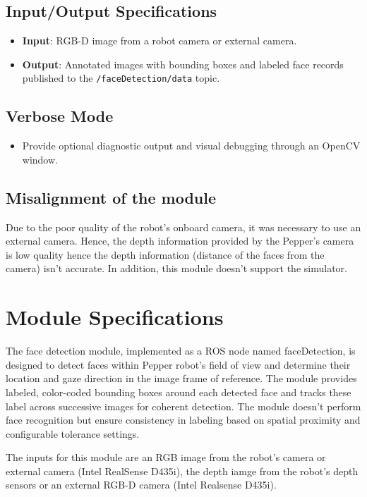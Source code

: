 \documentclass{CSSRforAfrica}
\begin{document}
\subsection*{Input/Output Specifications}
\begin{itemize}
	\item \textbf{Input}: RGB-D image from a robot camera or external camera.
	\item \textbf{Output}: Annotated images with bounding boxes and labeled face records published to the \texttt{/faceDetection/data} topic.
\end{itemize}

\subsection*{Verbose Mode}
\begin{itemize}
	\item Provide optional diagnostic output and visual debugging through an OpenCV window.
\end{itemize}


\subsection*{Misalignment of the module}
Due to the poor quality of the robot’s onboard camera, it was necessary to use an external camera. Hence, the depth information provided by the Pepper's camera is low quality hence the depth information (distance of the faces from the camera) isn't accurate. In addition, this module doesn't support the simulator. 

\newpage	

\section{Module Specifications}
The face detection module, implemented as a ROS node named faceDetection, is designed to detect faces within Pepper robot's field of view and determine their location and gaze direction in the image frame of reference. The module provides labeled, color-coded bounding boxes around each detected face and tracks these label across successive images for coherent detection. The module doesn't  perform face recognition but ensure consistency in labeling based on spatial proximity and configurable tolerance settings.

The inputs for this module are an RGB image from the robot's camera or external camera (Intel RealSense D435i), the depth iamge from the robot's depth sensors or an external RGB-D camera (Intel Realsense D435i).
\end{document}
